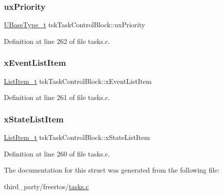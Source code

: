 \subsubsection{\texorpdfstring{ux\+Priority}{uxPriority}}
{\footnotesize\ttfamily \hyperlink{pic32mx_2portmacro_8h_a646f89d4298e4f5afd522202b11cb2e6}{U\+Base\+Type\+\_\+t} tsk\+Task\+Control\+Block\+::ux\+Priority}



Definition at line 262 of file tasks.\+c.

\mbox{\label{structtskTaskControlBlock_a1a1612b6081a13683808284d93a9b28f}} 
\subsubsection{\texorpdfstring{x\+Event\+List\+Item}{xEventListItem}}
{\footnotesize\ttfamily \hyperlink{list_8h_a1a62d469392f9bfe2443e7efab9c8398}{List\+Item\+\_\+t} tsk\+Task\+Control\+Block\+::x\+Event\+List\+Item}



Definition at line 261 of file tasks.\+c.

\mbox{\label{structtskTaskControlBlock_a16e0d20425d53ac78537e1fdb8834cf6}} 
\subsubsection{\texorpdfstring{x\+State\+List\+Item}{xStateListItem}}
{\footnotesize\ttfamily \hyperlink{list_8h_a1a62d469392f9bfe2443e7efab9c8398}{List\+Item\+\_\+t} tsk\+Task\+Control\+Block\+::x\+State\+List\+Item}



Definition at line 260 of file tasks.\+c.



The documentation for this struct was generated from the following file\+:\begin{DoxyCompactItemize}
\item 
third\+\_\+party/freertos/\hyperlink{tasks_8c}{tasks.\+c}\end{DoxyCompactItemize}

